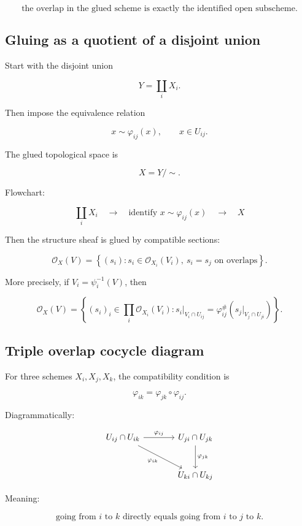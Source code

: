 \documentclass[12pt,a4paper]{article}
\newcommand{\OO}{\mathcal{O}}
\theoremstyle{notespace}
\begin{document}
\[
\boxed{
	\text{the overlap in the glued scheme is exactly the identified open subscheme.}
}
\]

\subsection{Gluing as a quotient of a disjoint union}

Start with the disjoint union

\[
Y=\coprod_i X_i.
\]

Then impose the equivalence relation

\[
x\sim \varphi_{ij}(x),
\qquad
x\in U_{ij}.
\]

The glued topological space is

\[
X=Y/{\sim}.
\]

Flowchart:

\[
\boxed{
	\coprod_i X_i
}
\quad
\longrightarrow
\quad
\boxed{
	\text{identify }x\sim\varphi_{ij}(x)
}
\quad
\longrightarrow
\quad
\boxed{
	X
}
\]

Then the structure sheaf is glued by compatible sections:

\[
\boxed{
	\OO_X(V)
	=
	\left\{
	(s_i):
	s_i\in\OO_{X_i}(V_i),
	\ s_i=s_j\text{ on overlaps}
	\right\}.
}
\]

More precisely, if \(V_i=\psi_i^{-1}(V)\), then

\[
\OO_X(V)
=
\left\{
(s_i)_i\in\prod_i\OO_{X_i}(V_i):
s_i|_{V_i\cap U_{ij}}
=
\varphi_{ij}^{\#}
\left(
s_j|_{V_j\cap U_{ji}}
\right)
\right\}.
\]

\subsection{Triple overlap cocycle diagram}

For three schemes \(X_i,X_j,X_k\), the compatibility condition is

\[
\varphi_{ik}
=
\varphi_{jk}\circ\varphi_{ij}.
\]

Diagrammatically:

\[
\begin{tikzcd}[column sep=large,row sep=large]
	U_{ij}\cap U_{ik}
	\arrow[r,"\varphi_{ij}"]
	\arrow[dr,"\varphi_{ik}"']
	&
	U_{ji}\cap U_{jk}
	\arrow[d,"\varphi_{jk}"]
	\\
	&
	U_{ki}\cap U_{kj}
\end{tikzcd}
\]

Meaning:

\[
\boxed{
	\text{going from }i\text{ to }k
	\text{ directly equals going from }i\text{ to }j\text{ to }k.
}
\]
\end{document}
